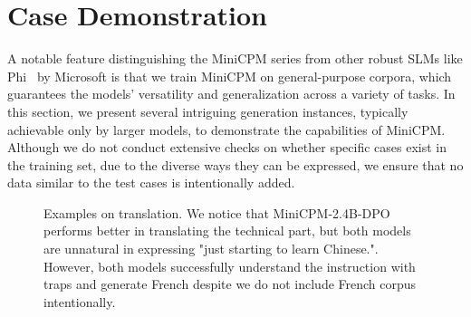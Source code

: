 
\section{Case Demonstration}
\label{app:cases}
A notable feature distinguishing the MiniCPM series from other robust SLMs like Phi~\citep{li2023textbooks} by Microsoft is that we train MiniCPM on general-purpose corpora, which guarantees the models' versatility and generalization across a variety of tasks. In this section, we present several intriguing generation instances, typically achievable only by larger models, to demonstrate the capabilities of MiniCPM. Although we do not conduct extensive checks on whether specific cases exist in the training set, due to the diverse ways they can be expressed, we ensure that no data similar to the test cases is intentionally added.


\begin{figure}[!h]
\centering
{}
\caption{Examples on translation. We notice that MiniCPM-2.4B-DPO performs better in translating the technical part, but both models are unnatural in expressing "just starting to learn Chinese.". However, both models successfully understand the instruction with traps and generate French despite we do not include French corpus intentionally.}
\label{fig:translation_example}
\end{figure}


